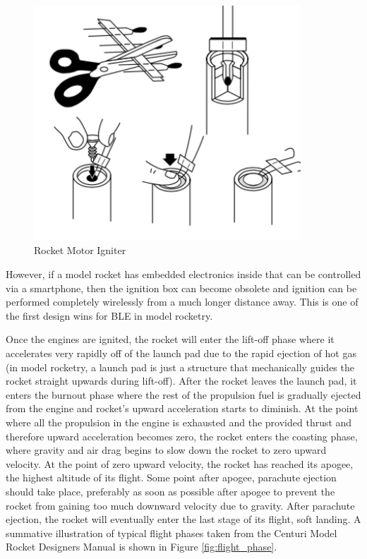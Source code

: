 \documentclass{workreport}
\begin{document}
\begin{body}
	\begin{figure}[!ht]
		\centering
		\includegraphics[width=10cm]{./images/igniter.png}
		\caption{Rocket Motor Igniter \cite{estes_rocket_tech}}
		\label{fig:igniter}
	\end{figure}

	However, if a model rocket has embedded electronics inside that can be controlled via a smartphone, then the ignition box can become obsolete and ignition can be performed completely wirelessly from a much longer distance away. This is one of the first design wins for BLE in model rocketry.

	Once the engines are ignited, the rocket will enter the lift-off phase where it accelerates very rapidly off of the launch pad due to the rapid ejection of hot gas (in model rocketry, a launch pad is just a structure that mechanically guides the rocket straight upwards during lift-off). After the rocket leaves the launch pad, it enters the burnout phase where the rest of the propulsion fuel is gradually ejected from the engine and rocket's upward acceleration starts to diminish. At the point where all the propulsion in the engine is exhausted and the provided thrust and therefore upward acceleration becomes zero, the rocket enters the coasting phase, where gravity and air drag begins to slow down the rocket to zero upward velocity. At the point of zero upward velocity, the rocket has reached its apogee, the highest altitude of its flight. Some point after apogee, parachute ejection should take place, preferably as soon as possible after apogee to prevent the rocket from gaining too much downward velocity due to gravity. After parachute ejection, the rocket will eventually enter the last stage of its flight, soft landing. A summative illustration of typical flight phases taken from the Centuri Model Rocket Designers Manual\cite{centuri_manual} is shown in Figure \ref{fig:flight_phase}.



\end{body}
\end{document}
